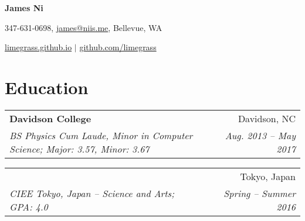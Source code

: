 \documentclass[letterpaper,11pt]{article}
\makeatletter
\newcommand{\resumeItem}[2]{
    \vspace{-2pt}
    \item\small{
        \textbf{#1}{ #2 \vspace{-2pt}}
    }
}
\newcommand{\resumeSubheading}[4]{
        \begin{tabular*}{0.97\textwidth}{l@{\extracolsep{\fill}}r}
            \textbf{#1} & #2 \\
            \textit{\small#3} & \textit{\small #4} \\
        \end{tabular*}
}
\newcommand{\resumeSubHeadingListStart}{}
\newcommand{\resumeSubHeadingListEnd}{}
\newcommand{\resumeItemListStart}{\begin{itemize}}
\newcommand{\resumeItemListEnd}{\end{itemize}}
\def\Cplusplus{C\raisebox{0.5ex}{\tiny\textbf{++}}}
\makeatother
\begin{document}

\begin{center}
    \LARGE{\textbf{James Ni}}

    \normalsize347-631-0698, \href{mailto:james@niis.me}{james@niis.me}, Bellevue, WA

    \normalsize\href{https://limegrass.github.io}{limegrass.github.io} $\vert$ \normalsize\href{http://github.com/limegrass}{github.com/limegrass}
\end{center}


\section{\textbf{Education}}
    \resumeSubHeadingListStart
        \resumeSubheading
            {Davidson College}{Davidson, NC}
                {BS Physics Cum Laude, Minor in Computer Science; Major: 3.57, Minor: 3.67}{Aug. 2013 -- May 2017}
        \resumeSubheading
            {Sophia University \begin{CJK}{UTF8}{min}(上智大学)\end{CJK} }{Tokyo, Japan}
            {CIEE Tokyo, Japan -- Science and Arts; GPA: 4.0}{Spring -- Summer 2016}
    \resumeSubHeadingListEnd
\end{document}
